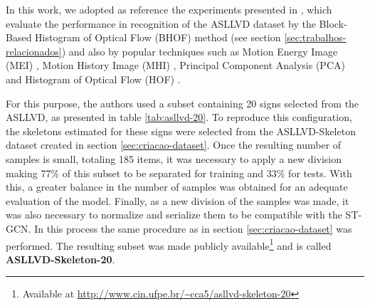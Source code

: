 In this work, we adopted as reference the experiments presented in \cite{lim-2016}, which evaluate the performance in recognition of the ASLLVD dataset by the Block-Based Histogram of Optical Flow (BHOF) method (see section \ref{sec:trabalhos-relacionados}) and also by popular techniques such as Motion Energy Image (MEI) \cite{athitsos-asllvd-2008}, Motion History Image (MHI) \cite{babu-2004}, Principal Component Analysis (PCA) \cite{dreuw-2012} and Histogram of Optical Flow (HOF) \cite{laptev-2008}.


For this purpose, the authors used a subset containing 20 signs selected from the ASLLVD, as presented in table \ref{tab:asllvd-20}. To reproduce this configuration, the skeletons estimated for these signs were selected from the ASLLVD-Skeleton dataset created in section \ref{sec:criacao-dataset}. Once the resulting number of samples is small, totaling 185 items, it was necessary to apply a new division making 77\% of this subset to be separated for training and 33\% for tests. With this, a greater balance in the number of samples was obtained for an adequate evaluation of the model. Finally, as a new division of the samples was made, it was also necessary to normalize and serialize them to be compatible with the ST-GCN. In this process the same procedure as in section \ref{sec:criacao-dataset} was performed. The resulting subset was made publicly available\footnote{
    Available at \url{http://www.cin.ufpe.br/~cca5/asllvd-skeleton-20}
} and is called \textbf{ASLLVD-Skeleton-20}.


